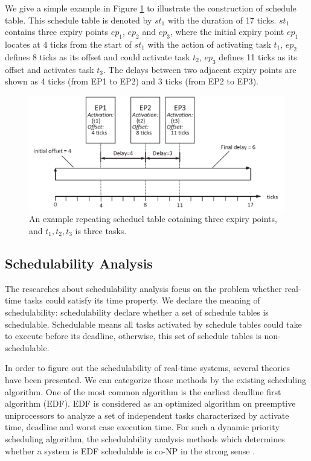 \documentclass[10pt,conference]{IEEEtran}
\begin{document}
We give a simple example in Figure \ref{figure_st1} to illustrate the construction of schedule table. This schedule table is denoted by $st_1$ with the duration of 17 ticks. $st_1$ contains three expiry points $ep_1$, $ep_2$ and $ep_3$, where the initial expiry point $ep_1$ locates at 4 ticks from the start of $st_1$ with the action of activating task $t_1$, $ep_2$ defines 8 ticks as its offset and could activate task $t_2$, $ep_3$ defines 11 ticks as its offset and activates task $t_3$. The delays between two adjacent expiry points are shown as 4 ticks (from EP1 to EP2) and 3 ticks (from EP2 to EP3).
\begin{figure}[t]
  \centering
  \includegraphics[scale=.32]{graphics/figure_st1-eps-converted-to.pdf}
  \caption{An example repeating scheduel table cotaining three expiry points, and $t_1,t_2,t_3$ is three tasks.}
  \label{figure_st1}
\end{figure}
\subsection{Schedulability Analysis}
The researches about schedulability analysis focus on the problem whether real-time tasks could satisfy its time property. We declare the meaning of schedulability: schedulability declare whether a set of schedule tables is schedulable. Schedulable means all tasks activated by schedule tables could take to execute before its deadline, otherwise, this set of schedule tables is non-schedulable.

In order to figure out the schedulability of real-time systems, several theories have been presented. We can categorize those methods by the existing scheduling algorithm. One of the most common algorithm is the earliest deadline first algorithm (EDF). EDF is considered as an optimized algorithm on preemptive uniprocessors to analyze a set of independent tasks characterized by activate time, deadline and worst case execution time. For such a dynamic priority scheduling algorithm, the schedulability analysis methods which determines whether a system is EDF schedulable is co-NP in the strong sense \cite{Goossens:1999:LWC:553897}.
\end{document}
